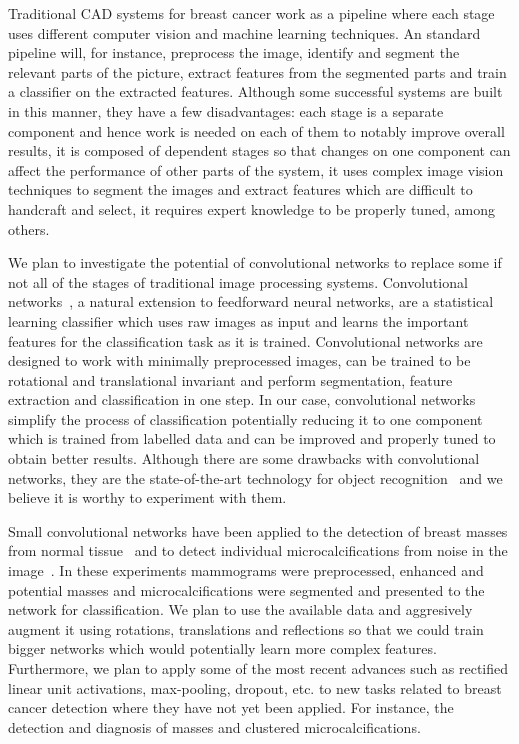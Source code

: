Traditional CAD systems for breast cancer work as a pipeline where each stage uses different computer vision and machine learning techniques. An standard pipeline will, for instance, preprocess the image, identify and segment the relevant parts of the picture, extract features from the segmented parts and train a classifier on the extracted features. Although some successful systems are built in this manner, they have a few disadvantages: each stage is a separate component and hence work is needed on each of them to notably improve overall results, it is composed of dependent stages so that changes on one component can affect the performance of other parts of the system, it uses complex image vision techniques to segment the images and extract features which are difficult to handcraft and select, it requires expert knowledge to be properly tuned, among others.

We plan to investigate the potential of convolutional networks to replace some if not all of the stages of traditional image processing systems. Convolutional networks~\cite{Fukushima1980,LeCun1998}, a natural extension to feedforward neural networks, are a statistical learning classifier which uses raw images as input and learns the important features for the classification task as it is trained. Convolutional networks are designed to work with minimally preprocessed images, can be trained to be rotational and translational invariant and perform segmentation, feature extraction and classification in one step. In our case, convolutional networks simplify the process of classification potentially reducing it to one component which is trained from labelled data and can be improved and properly tuned to obtain better results. Although there are some drawbacks with convolutional networks, they are the state-of-the-art technology for object recognition~\cite{Russakovsky2014} and we believe it is worthy to experiment with them.

Small convolutional networks have been applied to the detection of breast masses from normal tissue~\cite{Sahiner1996} and to detect individual microcalcifications from noise in the image~\cite{Lo1995, Ge2007}. In these experiments mammograms were preprocessed, enhanced and potential masses and microcalcifications were segmented and presented to the network for classification. We plan to use the available data and aggresively augment it using rotations, translations and reflections so that we could train bigger networks which would potentially learn more complex features. Furthermore, we plan to apply some of the most recent advances such as rectified linear unit activations, max-pooling, dropout, etc. to new tasks related to breast cancer detection where they have not yet been applied. For instance, the detection and diagnosis of masses and clustered microcalcifications.

